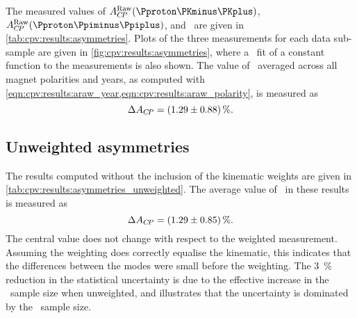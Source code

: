 The measured values of $\ARaw(\pKK)$, $\ARaw(\ppipi)$, and \dACP\ are given in 
\cref{tab:cpv:results:asymmetries}.
Plots of the three measurements for each data sub-sample are given in 
\cref{fig:cpv:results:asymmetries}, where a \chisq\ fit of a constant function 
to the measurements is also shown.
The value of \dACP\ averaged across all magnet polarities and years, as 
computed with \cref{eqn:cpv:results:araw_year,eqn:cpv:results:araw_polarity}, 
is measured as
\begin{equation*}
  \dACP = \deltaACP.
  \label{eqn:cpv:results:dacp}
\end{equation*}

\subsection{Unweighted asymmetries}

The results computed without the inclusion of the kinematic weights are given 
in \cref{tab:cpv:results:asymmetries_unweighted}.
The average value of \dACP\ in these results is measured as
\begin{equation*}
  \dACP = \deltaACPUnweighted.
\end{equation*}
The central value does not change with respect to the weighted measurement.
Assuming the weighting does correctly equalise the kinematic, this indicates 
that the differences between the modes were small before the weighting.
The \SI{3}{\percent} reduction in the statistical uncertainty is due to the 
effective increase in the \ppipi\ sample size when unweighted, and illustrates 
that the uncertainty is dominated by the \pKK\ sample size.

\begin{table}
  \centering
  \caption{%
    Measured asymmetries for each data sub-sample and combination of 
    sub-samples.
    The computation of the combinations, ``2011 + 2012'' and ``Average'', is 
    defined in \cref{chap:cpv:results:combination}.
  }
  \label{tab:results:asymmetries}
    
\end{table}

\begin{table}
  \centering
  \caption{%
    Measured asymmetries for each data sub-sample and combination of 
    sub-samples without the inclusion of the kinematic weights.
    The computation of the combinations, ``2011 + 2012'' and ``Average'', is 
    defined in \cref{chap:cpv:results:combination}.
  }
  \label{tab:results:asymmetries_unweighted}
    
\end{table}


